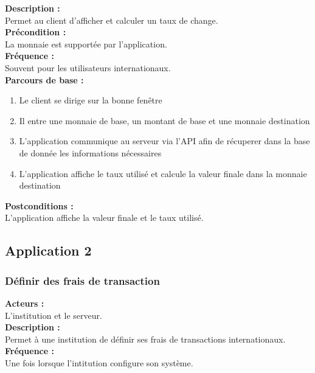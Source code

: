 \documentclass[../annexe.tex]{subfiles}
\begin{document}
\textbf{Description :} \\
Permet au client d'afficher et calculer un taux de change. \\

\textbf{Précondition :} \\
La monnaie est supportée par l'application. \\

\textbf{Fréquence :} \\
Souvent pour les utilisateurs internationaux. \\

\textbf{Parcours de base :} \\
\begin{enumerate}
    \item Le client se dirige sur la bonne fenêtre
    \item Il entre une monnaie de base, un montant de base et une monnaie destination
    \item L'application communique au serveur via l'API afin de récuperer dans la base de donnée les informations nécessaires
    \item L'application affiche le taux utilisé et calcule la valeur finale dans la monnaie destination
\end{enumerate}
\bigskip

\textbf{Postconditions :} \\
L'application affiche la valeur finale et le taux utilisé. \\



\subsection{Application 2}



\subsubsection{Définir des frais de transaction}

\textbf{Acteurs :} \\
L'institution et le serveur. \\

\textbf{Description :} \\
Permet à une institution de définir ses frais de transactions internationaux. \\

\textbf{Fréquence :} \\
Une fois lorsque l'intitution configure son système. \\
\end{document}
